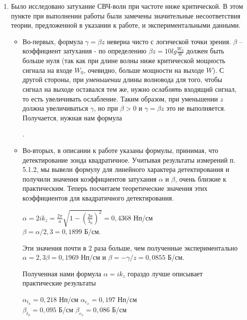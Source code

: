 \documentclass[a4paper]{article}
\begin{document}
\begin{enumerate}
\item
    Было исследовано затухание СВЧ-волн при частоте ниже критической. В этом пункте при выполнении работы были замечены значительные несоответствия теории, предложенной в указании к работе, и экспериментальными данными. 
\begin{itemize}
    \item Во-первых, формула $\gamma = \beta z$ неверна чисто с логической точки зрения. $\beta$ -- коэффициент затухания - по определению $\beta z = 10 lg\frac{W_0}{W}$ должен быть больше нуля (так как при длине волны ниже критической мощность сигнала на входе $W_0$, очевидно, больше мощности на выходе $W$). С другой стороны, при \textit{уменьшении} длины волновода для того, чтобы сигнал на выходе оставался тем же, нужно \textit{ослаблять} входящий сигнал, то есть увеличивать ослабление. Таким образом, при уменьшении $z$ должна увеличиваться $\gamma$, но при $\beta > 0$ и $\gamma = \beta z$ это не выполняется. Получается, нужная нам формула
\begin{center}
      .  
\end{center}

    
    \item
    Во-вторых, в описании к работе указаны формулы, принимая, что детектирование зонда квадратичное. Учитывая результаты измерений п. 5.1.2, мы вывели формулу для линейного характера детектирования и получили значения коэффициентов затухания $\alpha$ и $\beta$, очень близкие к практическим. Теперь посчитаем теоретические значения этих коэффициентов для квадратичного детектирования.
    
\begin{center}
    $\alpha = 2ik_z = \frac{2\pi}{a}\sqrt{1 - (\frac{2a}{\lambda_0})^2} = 0,4368$ Нп/см \\
    $\beta = \alpha / 2,3 = 0,1899$ Б/см. 
\end{center}
    Эти значения почти в 2 раза больше, чем полученные экспериментально $\alpha = 2,3\beta = 0,1969$ Нп/см и $\beta = - \gamma/z = 0,0855$ Б/см.
    
    Полученная нами формула $\alpha = ik_z$ гораздо лучше описывает практические результаты
    
\begin{center}
    $\alpha_t_h = 0,218$ Нп/см \hspace{1cm} $\alpha_e_x = 0,197$ Нп/см\\
    $\beta_t_h = 0,095$ Б/см \hspace{1cm} $\beta_e_x = 0,086$ Б/см
\end{center}
    
\end{itemize}
    
\end{enumerate}
\end{document}
